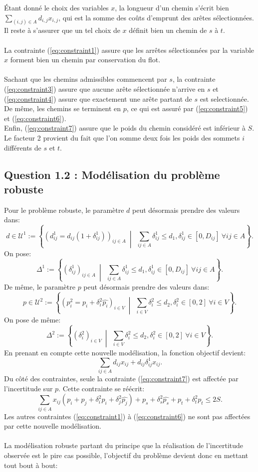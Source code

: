 \documentclass{article}
\begin{document}
Étant donné le choix des variables $x$, la longueur d'un chemin s'écrit bien $\sum_{(i,j) \in A} d_{i,j} x_{i,j}$, qui est la somme des coûts d'emprunt des arêtes sélectionnées. Il reste à s'assurer que un tel choix de $x$ définit bien un chemin de $s$ à $t$.
\\
\\
La contrainte (\ref{eq:constraint1}) assure que les arrêtes sélectionnées par la variable $x$ forment bien un chemin par conservation du flot.
\\
\\
Sachant que les chemins admissibles commencent par $s$, la contrainte (\ref{eq:constraint3}) assure que aucune arête sélectionnée n'arrive en $s$ et (\ref{eq:constraint4}) assure que exactement une arête partant de $s$ est selectionnée. De même, les chemins se terminent en $p$, ce qui est assuré par (\ref{eq:constraint5}) et (\ref{eq:constraint6}).
\\
Enfin, (\ref{eq:constraint7}) assure que le poids du chemin considéré est inférieur à $S$. Le facteur 2 provient du fait que l'on somme deux fois les poids des sommets $i$ différents de $s$ et $t$.

\subsection{Question 1.2 : Modélisation du problème robuste}

Pour le problème robuste, le paramètre $d$ peut désormais prendre des valeurs dans:
\[
d \in \mathcal{U}^{1} := \left\{(d^{1}_{ij} = d_{ij}(1 + \delta^{1}_{ij}))_{ij \in A} \ \middle|\ \ \sum_{ij \in A} \delta^{1}_{ij} \leq d_1, \delta^{1}_{ij} \in [0, D_{ij}] \ \forall ij \in A\right\}.
\]
On pose:
\[
\Delta^{1} := \left\{(\delta^{1}_{ij})_{ij \in A} \ \middle|\ \ \sum_{ij \in A} \delta^{1}_{ij} \leq d_1, \delta^{1}_{ij} \in [0, D_{ij}] \ \forall ij \in A\right\}.
\]
De même, le paramètre $p$ peut désormais prendre des valeurs dans:
\[
p \in \mathcal{U}^{2} := \left\{(p^{2}_{i} = p_{i} + \delta^{2}_{i} \hat{p_i})_{i \in V} \ \middle|\ \ \sum_{i \in V} \delta^{2}_{i} \leq d_2, \delta^{2}_{i} \in [0, 2] \ \forall i \in V\right\}.
\]
On pose de même:
\[
\Delta^{2} := \left\{(\delta^{2}_{i})_{i \in V} \ \middle|\ \ \sum_{i \in V} \delta^{2}_{i} \leq d_2, \delta^{2}_{i} \in [0, 2] \ \forall i \in V\right\}.
\]
En prenant en compte cette nouvelle modélisation, la fonction objectif devient:
$$\sum_{ij \in A} d_{ij} x_{ij} + d_{ij} \delta_{ij}^{1} x_{ij}.$$
Du côté des contraintes, seule la contrainte (\ref{eq:constraint7}) est affectée par l'incertitude sur $p$. Cette contrainte se réécrit:
$$\sum_{ij \in A} x_{ij}(p_i + p_j + \delta_{i}^{2} \hat{p_i} + \delta_{j}^{2} \hat{p_j}) + p_s + \delta_{s}^{2} \hat{p_s} + p_t + \delta_{t}^{2} \hat{p_t} \leq 2S.$$
Les autres contraintes (\ref{eq:constraint1}) à (\ref{eq:constraint6}) ne sont pas affectées par cette nouvelle modélisation.
\\
\\
La modélisation robuste partant du principe que la réalisation de l'incertitude observée est le pire cas possible, l'objectif du problème devient donc en mettant tout bout à bout:
\end{document}
